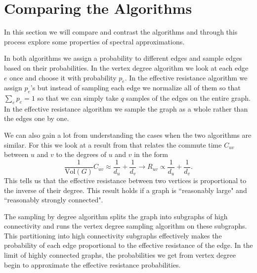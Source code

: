 \documentclass[12pt,twoside]{article}
\begin{document}
\section{Comparing the Algorithms}
\label{comparing-algorithms}

In this section we will compare and contrast the algorithms and through this process explore some properties of spectral approximations. 


In both algorithms we assign a probability to different edges and sample edges based on their probabilities. In the vertex degree algorithm we look at each edge $e$ once and choose it with probability $p_e$. In the effective resistance algorithm we assign $p_e$'s but instead of sampling each edge we normalize all of them so that $\sum_e p_e = 1$ so that we can simply take $q$ samples of the edges on the entire graph. In the effective resistance algorithm we sample the graph as a whole rather than the edges one by one. 

We can also gain a lot from understanding the cases when the two algorithms are similar. For this we look at a result from \cite{hitting-commute-time} that relates the commute time $C_{uv}$ between $u$ and $v$ to the degrees of $u$ and $v$ in the form
%
\begin{equation}
\frac{1}{\text{Vol}(G)} C_{uv} \approx \frac{1}{d_u} + \frac{1}{d_v} \rightarrow R_{uv} \propto \frac{1}{d_u} + \frac{1}{d_v}.
\end{equation}
%
This tells us that the effective resistance between two vertices is proportional to the inverse of their degree. This result holds if a graph is ``reasonably large" and ``reasonably strongly connected". 

The sampling by degree algorithm splits the graph into subgraphs of high connectivity and runs the vertex degree sampling algorithm on these subgraphs. This partitioning into high connectivity subgraphs effectively makes the probability of each edge proportional to the effective resistance of the edge. In the limit of highly connected graphs, the probabilities we get from vertex degree begin to approximate the effective resistance probabilities. 
\end{document}
